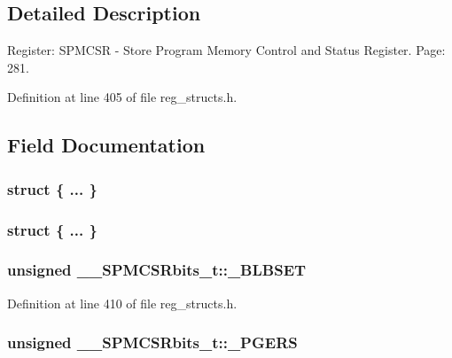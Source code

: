 \subsection{Detailed Description}
Register\+: S\+P\+M\+C\+S\+R -\/ Store Program Memory Control and Status Register. Page\+: 281. 

Definition at line 405 of file reg\+\_\+structs.\+h.



\subsection{Field Documentation}
\hypertarget{union_____s_p_m_c_s_rbits__t_a18f111089254d6b7158caeadd23ce5de}{\subsubsection[{"@97}]{\setlength{\rightskip}{0pt plus 5cm}struct \{ ... \} }}\label{union_____s_p_m_c_s_rbits__t_a18f111089254d6b7158caeadd23ce5de}
\hypertarget{union_____s_p_m_c_s_rbits__t_a82299fd1b032fccc33b4b60c8a76289d}{\subsubsection[{"@99}]{\setlength{\rightskip}{0pt plus 5cm}struct \{ ... \} }}\label{union_____s_p_m_c_s_rbits__t_a82299fd1b032fccc33b4b60c8a76289d}
\hypertarget{union_____s_p_m_c_s_rbits__t_a2d508d88ac248656af65a48dc98dc84d}{
\subsubsection[{\+\_\+\+B\+L\+B\+S\+E\+T}]{\setlength{\rightskip}{0pt plus 5cm}unsigned \+\_\+\+\_\+\+S\+P\+M\+C\+S\+Rbits\+\_\+t\+::\+\_\+\+B\+L\+B\+S\+E\+T}}\label{union_____s_p_m_c_s_rbits__t_a2d508d88ac248656af65a48dc98dc84d}


Definition at line 410 of file reg\+\_\+structs.\+h.

\hypertarget{union_____s_p_m_c_s_rbits__t_a92df82c891fcf457fb690845fb436312}{
\subsubsection[{\+\_\+\+P\+G\+E\+R\+S}]{\setlength{\rightskip}{0pt plus 5cm}unsigned \+\_\+\+\_\+\+S\+P\+M\+C\+S\+Rbits\+\_\+t\+::\+\_\+\+P\+G\+E\+R\+S}}\label{union_____s_p_m_c_s_rbits__t_a92df82c891fcf457fb690845fb436312}


